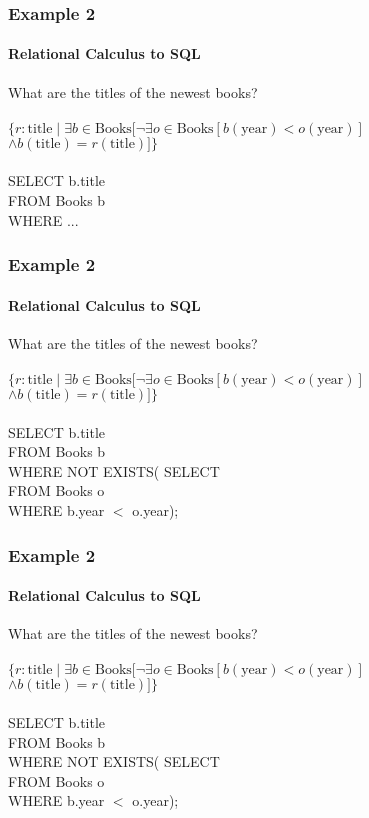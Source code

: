\documentclass{beamer}
\begin{document}
\begin{frame}
  \frametitle{Example 2}
    \framesubtitle{Relational Calculus to SQL}
  What are the titles of the newest books?\\
  \hfill \\
  $\{r:\text{title} \mid \exists b \in \text{Books} [ \neg\exists o \in \text{Books} [ b(\text{year}) < o(\text{year})]$\\
  $\land b(\text{title}) = r(\text{title})] \}$\\
  \hfill \\
  SELECT b.title\\
  FROM Books b\\
  WHERE ...
\end{frame}
\begin{frame}
  \frametitle{Example 2}
    \framesubtitle{Relational Calculus to SQL}
  What are the titles of the newest books?\\
  \hfill \\
  $\{r:\text{title} \mid \exists b \in \text{Books} [ \neg\exists o \in \text{Books} [ b(\text{year}) < o(\text{year})]$\\
  $\land b(\text{title}) = r(\text{title})] \}$\\
  \hfill \\
  SELECT b.title\\
  FROM Books b\\
  WHERE NOT EXISTS( SELECT\\
  FROM Books o \\
  WHERE b.year $<$ o.year);
\end{frame}
\begin{frame}
  \frametitle{Example 2}
    \framesubtitle{Relational Calculus to SQL}
  What are the titles of the newest books?\\
  \hfill \\
  $\{r:\text{title} \mid \exists b \in \text{Books} [ \neg\exists o \in \text{Books} [ b(\text{year}) < o(\text{year})]$\\
  $\land b(\text{title}) = r(\text{title})] \}$\\
  \hfill \\
  SELECT b.title\\
  FROM Books b\\
  WHERE NOT EXISTS( SELECT \\
  FROM Books o\\
  WHERE b.year $<$ o.year);
\end{frame}
\end{document}
